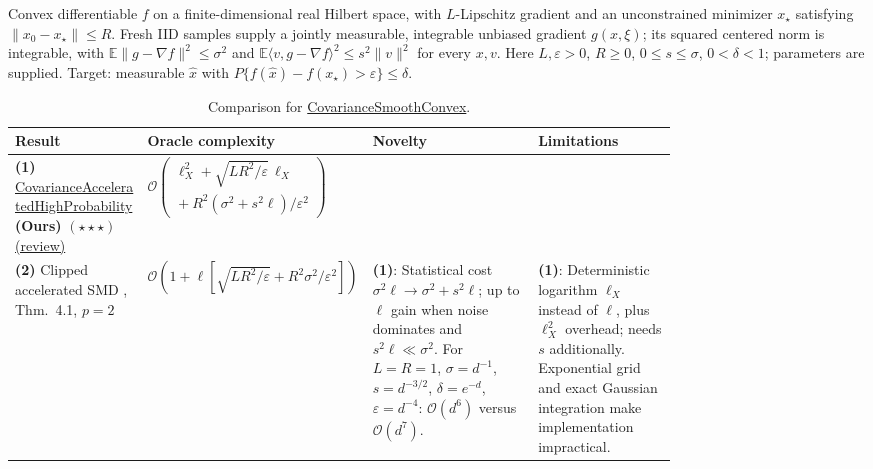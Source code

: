 \begin{table}[tp]
\centering
\caption{Comparison for \href{https://github.com/k3nfalt/longtails/blob/main/LongTails/Setups/CovarianceSmoothConvex.lean}{CovarianceSmoothConvex}.}\label{tab:CovarianceSmoothConvex}
\parbox{\linewidth}{\footnotesize Convex differentiable $f$ on a finite-dimensional real Hilbert space, with $L$-Lipschitz gradient and an unconstrained minimizer $x_\star$ satisfying $\|x_0-x_\star\|\le R$. Fresh IID samples supply a jointly measurable, integrable unbiased gradient $g(x,\xi)$; its squared centered norm is integrable, with $\mathbb E\|g-\nabla f\|^2\le\sigma^2$ and $\mathbb E\langle v,g-\nabla f\rangle^2\le s^2\|v\|^2$ for every $x,v$. Here $L,\varepsilon>0$, $R\ge0$, $0\le s\le\sigma$, $0<\delta<1$; parameters are supplied. Target: measurable $\hat x$ with $P\{f(\hat x)-f(x_\star)>\varepsilon\}\le\delta$.}\par\smallskip
\begin{threeparttable}
\footnotesize
\setlength{\tabcolsep}{4pt}\renewcommand{\arraystretch}{1.25}
\begin{tabularx}{\linewidth}{@{}>{\raggedright\arraybackslash}p{0.20\linewidth}>{\raggedright\arraybackslash}p{0.32\linewidth}>{\raggedright\arraybackslash}p{0.25\linewidth}>{\raggedright\arraybackslash}X@{}}
\toprule
\textbf{Result} & \textbf{Oracle complexity} & \textbf{Novelty} & \textbf{Limitations} \\
\midrule
\textbf{(1)} \href{https://github.com/k3nfalt/longtails/blob/main/LongTails/Theorems/CovarianceAcceleratedHighProbability.lean}{Covariance\allowbreak Accelerated\allowbreak High\allowbreak Probability} \textbf{(Ours)} $(\star\star\star)$ \href{https://github.com/k3nfalt/longtails/blob/main/scripts/reviews/CovarianceAcceleratedHighProbability.md}{(review)} &
$\mathcal{O}\!\left(\begin{gathered}\ell_X^2+\sqrt{LR^2/\varepsilon}\,\ell_X\\{}+R^2(\sigma^2+s^2\ell)/\varepsilon^2\end{gathered}\right)$ & & \\
\midrule[1.2pt]
\textbf{(2)} Clipped accelerated SMD \citep{cscNguyen2023v2}, Thm.~4.1, $p=2$ &
$\mathcal{O}\!\left(1+\ell\left[\sqrt{LR^2/\varepsilon}+R^2\sigma^2/\varepsilon^2\right]\right)$ &
\textbf{(1)}: Statistical cost $\sigma^2\ell\to\sigma^2+s^2\ell$; up to $\ell$ gain when noise dominates and $s^2\ell\ll\sigma^2$. For $L=R=1$, $\sigma=d^{-1}$, $s=d^{-3/2}$, $\delta=e^{-d}$, $\varepsilon=d^{-4}$: $\mathcal{O}(d^6)$ versus $\mathcal{O}(d^7)$. &
\textbf{(1)}: Deterministic logarithm $\ell_X$ instead of $\ell$, plus $\ell_X^2$ overhead; needs $s$ additionally. Exponential grid and exact Gaussian integration make implementation impractical. \\

\end{tabularx}
\end{threeparttable}
\end{table}
